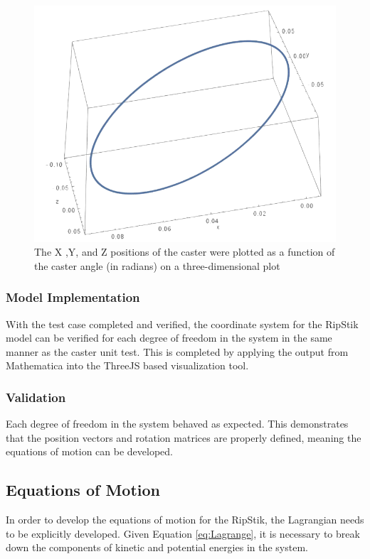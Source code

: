 \begin{figure}[!htb]
	\centering
	\includegraphics[width=\linewidth]{CasterWheel3DTest.png}
	\caption{The X ,Y, and Z positions of the caster were plotted as a function of the caster angle (in radians) on a three-dimensional plot}\label{fig:CasterWheel3DTest}
	\endminipage
\end{figure} 

\subsubsection{Model Implementation}

With the test case completed and verified, the coordinate system for the RipStik model can be verified for each degree of freedom in the system in the same manner as the caster unit test. 
This is completed by applying the output from Mathematica into the ThreeJS based visualization tool.
\subsubsection{Validation}
Each degree of freedom in the system behaved as expected. 
This demonstrates that the position vectors and rotation matrices are properly defined, meaning the equations of motion can be developed.
\subsection{Equations of Motion}

In order to develop the equations of motion for the RipStik, the Lagrangian needs to be explicitly developed. Given Equation \ref{eq:Lagrange}, it is necessary to break down the components of kinetic and potential energies in the system.

